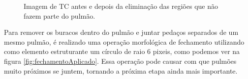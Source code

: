 \begin{figure}[ht]
 \begin{center}
 \end{center}
 \caption{Imagem de TC antes e depois da eliminação das regiões que não fazem parte do pulmão.}
 \label{fig:clean}
\end{figure}

Para remover os buracos dentro do pulmão e juntar pedaços separados de um mesmo pulmão, é realizado uma operação morfológica de fechamento utilizando como elemento estruturante um círculo de raio 6 pixeis, como podemos ver na figura \ref{fig:fechamentoAplicado}. Essa operação pode causar com que pulmões muito próximos se juntem, tornando a próxima etapa ainda mais importante.

